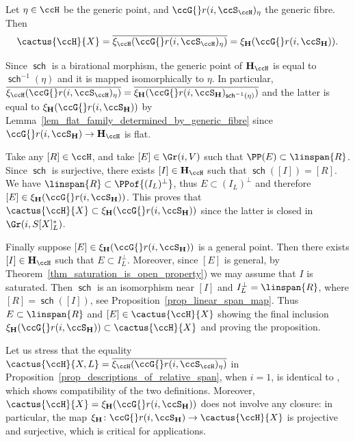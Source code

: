 \documentclass[12pt,a4paper]{article}
\DeclareMathOperator{\sch}{\mathsf {sch}}
\newcommand{\relGr}{\ccG{}r}
\begin{document}
\begin{prop}
   \label{prop_descriptions_of_relative_span}
  Let $\eta\in \ccH$ be the generic point,
   and $\relGr(i,\ccS_{\ccH})_{\eta}$ the generic fibre.
  Then
  \[
   \cactus{\ccH}{X} = \overline{\xi_{\ccH}(\relGr(i,\ccS_{\ccH})_{\eta})} = \xi_{\mathbf{H}} (\relGr(i,\ccS_{\mathbf{H}})).
  \]
\end{prop}

\begin{prf}
  Since $\sch$ is a birational morphism, the generic point of
  $\mathbf{H}_{\ccH}$ is equal to $\sch^{-1}(\eta)$ and it is mapped isomorphically to $\eta$.
  In particular, $\overline{\xi_{\ccH}(\relGr(i,\ccS_{\ccH})_{\eta})}= \overline{\xi_{\mathbf{H}}(\relGr(i,\ccS_{\mathbf{H}})_{\sch^{-1}(\eta)})}$
  and the latter is
  equal to
  $\xi_{\mathbf{H}} (\relGr(i,\ccS_{\mathbf{H}}))$ by Lemma~\ref{lem_flat_family_determined_by_generic_fibre} since $\relGr(i,\ccS_{\mathbf{H}})\to \mathbf{H}_{\ccH}$ is flat.

  Take any $[R]\in \ccH$, and take $[E] \in \Gr(i, V)$ such that $\PP(E)\subset \linspan{R}$.
  Since $\sch$ is surjective,
    there exists $[I]\in \mathbf{H}_{\ccH}$ such that $\sch([I]) = [R]$.
  We have $\linspan{R} \subset \PPof{(I_L)^{\perp}}$,
  thus $E\subset (I_L)^{\perp}$
  and therefore $[E]\in  \xi_{\mathbf{H}} (\relGr(i,\ccS_{\mathbf{H}}))$.
  This proves that $\cactus{\ccH}{X} \subset \xi_{\mathbf{H}} (\relGr(i,\ccS_{\mathbf{H}}))$ since the latter is closed in $\Gr(i, S[X]^*_L)$.

  Finally suppose $[E]\in \xi_{\mathbf{H}} (\relGr(i,\ccS_{\mathbf{H}}))$ is a general point.
  Then there exists $[I]\in \mathbf{H}_{\ccH}$  such that $E\subset I_L^{\perp}$.
  Moreover, since $[E]$ is general,
  by Theorem~\ref{thm_saturation_is_open_property})
  we may assume that $I$ is saturated.
 Then $\sch$ is an isomorphism near $[I]$
    and $I_L^{\perp} = \linspan{R}$, where $[R] = \sch([I])$, see Proposition~\ref{prop_linear_span_map}.
  Thus $E\subset\linspan{R}$ and $[E]\in \cactus{\ccH}{X}$ showing the final inclusion
  $\xi_{\mathbf{H}} (\relGr(i,\ccS_{\mathbf{H}})) \subset \cactus{\ccH}{X}$ and proving the proposition.
\end{prf}



Let us stress that the equality
$\cactus{\ccH}{X, L} = \overline{\xi_{\ccH}(\relGr(i,\ccS_{\ccH})_{\eta})}$ in
Proposition~\ref{prop_descriptions_of_relative_span}, when  $i=1$, is identical to
\cite[Def.~5.23]{jabu_jelisiejew_finite_schemes_and_secants},
which shows compatibility of the two definitions.
Moreover, $\cactus{\ccH}{X} = \xi_{\mathbf{H}} (\relGr(i,\ccS_{\mathbf{H}}))$ does not involve any closure:
in particular, the map $\xi_{\mathbf{H}}\colon \relGr(i,\ccS_{\mathbf{H}})\to \cactus{\ccH}{X}$ is projective and surjective,
which is critical for  applications.
\end{document}
